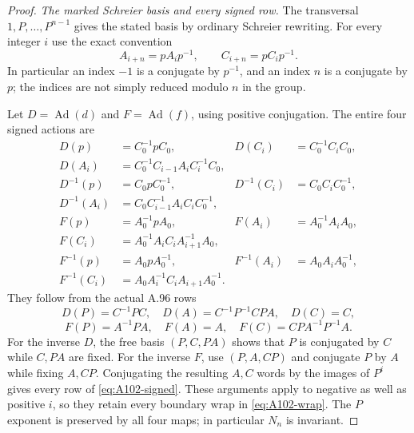 \begin{proof}
\emph{The marked Schreier basis and every signed row.}
The transversal $1,P,\ldots,P^{n-1}$ gives the stated basis by ordinary
Schreier rewriting. For every integer $i$ use the exact convention
\begin{equation}\label{eq:A102-wrap}
 A_{i+n}=pA_ip^{-1},\qquad C_{i+n}=pC_ip^{-1}.
\end{equation}
In particular an index $-1$ is a conjugate by $p^{-1}$, and an index
$n$ is a conjugate by $p$; the indices are not simply reduced modulo
$n$ in the group.

Let $D=\operatorname{Ad}(d)$ and $F=\operatorname{Ad}(f)$, using
positive conjugation. The entire four signed actions are
\begin{equation}\label{eq:A102-signed}
\begin{aligned}
 D(p)&=C_0^{-1}pC_0,&D(C_i)&=C_0^{-1}C_iC_0,\\
 D(A_i)&=C_0^{-1}C_{i-1}A_iC_i^{-1}C_0,&&\\
 D^{-1}(p)&=C_0pC_0^{-1},&
 D^{-1}(C_i)&=C_0C_iC_0^{-1},\\
 D^{-1}(A_i)&=C_0C_{i-1}^{-1}A_iC_iC_0^{-1},&&\\
 F(p)&=A_0^{-1}pA_0,&F(A_i)&=A_0^{-1}A_iA_0,\\
 F(C_i)&=A_0^{-1}A_iC_iA_{i+1}^{-1}A_0,&&\\
 F^{-1}(p)&=A_0pA_0^{-1},&F^{-1}(A_i)&=A_0A_iA_0^{-1},\\
 F^{-1}(C_i)&=A_0A_i^{-1}C_iA_{i+1}A_0^{-1}.&&
\end{aligned}
\end{equation}
They follow from the actual A.96 rows
\[
 D(P)=C^{-1}PC,\quad D(A)=C^{-1}P^{-1}CPA,\quad D(C)=C,
\]
\[
 F(P)=A^{-1}PA,\quad F(A)=A,\quad F(C)=CPA^{-1}P^{-1}A.
\]
For the inverse $D$, the free basis $(P,C,PA)$ shows that $P$ is
conjugated by $C$ while $C,PA$ are fixed. For the inverse $F$, use
$(P,A,CP)$ and conjugate $P$ by $A$ while fixing $A,CP$.
Conjugating the resulting $A,C$ words by the images of $P^i$ gives
every row of \eqref{eq:A102-signed}. These arguments apply to negative
as well as positive $i$, so they retain every boundary wrap in
\eqref{eq:A102-wrap}. The $P$ exponent is preserved by all four maps;
in particular $N_n$ is invariant.


\end{proof}
